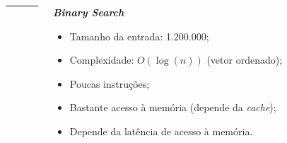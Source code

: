 \documentclass{beamer}
\begin{document}
\begin{frame}
\begin{columns}
\begin{column}{0.33\textwidth}
            \end{column}

            \begin{column}{0.01\textwidth}
                \rule{.1mm}{0.75\textheight}
            \end{column}

            \begin{column}{0.33\textwidth}

                \begin{center}
                    \textbf{\textit{Binary Search}}
                \end{center}

                \begin{itemize}
                    \footnotesize
                    \item Tamanho da entrada: 1.200.000;
                    \item Complexidade: $O(\log(n))$ (vetor ordenado);
                    \item Poucas instruções;
                    \item Bastante acesso à memória (depende da \textit{cache});
                    \item Depende da latência de acesso à memória.
                \end{itemize}

            \end{column}
        \end{columns}
    \end{frame}
\end{document}
